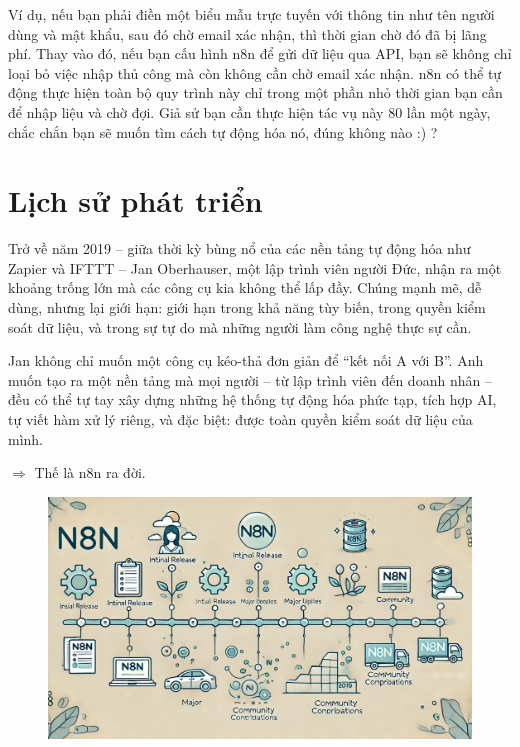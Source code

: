 Ví dụ, nếu bạn phải điền một biểu mẫu trực tuyến với thông tin như tên người dùng và mật khẩu, sau đó chờ email xác nhận, thì thời gian chờ đó đã bị lãng phí. Thay vào đó, nếu bạn cấu hình n8n để gửi dữ liệu qua API, bạn sẽ không chỉ loại bỏ việc nhập thủ công mà còn không cần chờ email xác nhận. n8n có thể tự động thực hiện toàn bộ quy trình này chỉ trong một phần nhỏ thời gian bạn cần để nhập liệu và chờ đợi. Giả sử bạn cần thực hiện tác vụ này 80 lần một ngày, chắc chắn bạn sẽ muốn tìm cách tự động hóa nó, đúng không nào :) ?



\section{Lịch sử phát triển}

Trở về năm 2019 – giữa thời kỳ bùng nổ của các nền tảng tự động hóa như Zapier và IFTTT – Jan Oberhauser, một lập trình viên người Đức, nhận ra một khoảng trống lớn mà các công cụ kia không thể lấp đầy. Chúng mạnh mẽ, dễ dùng, nhưng lại giới hạn: giới hạn trong khả năng tùy biến, trong quyền kiểm soát dữ liệu, và trong sự tự do mà những người làm công nghệ thực sự cần.

Jan không chỉ muốn một công cụ kéo-thả đơn giản để “kết nối A với B”. Anh muốn tạo ra một nền tảng mà mọi người – từ lập trình viên đến doanh nhân – đều có thể tự tay xây dựng những hệ thống tự động hóa phức tạp, tích hợp AI, tự viết hàm xử lý riêng, và đặc biệt: được toàn quyền kiểm soát dữ liệu của mình.

$\Rightarrow$ Thế là n8n ra đời.

\newpage

\begin{figure}[htbp]
    \centering
    \includegraphics[width=1\linewidth]{images/history.png}
\end{figure}

